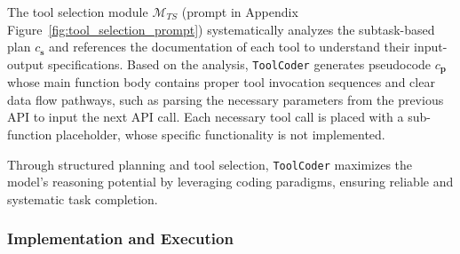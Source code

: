 The tool selection module $\mathcal{M}_{TS}$ (prompt in Appendix Figure~\ref{fig:tool_selection_prompt}) systematically analyzes the subtask-based plan $c_{\boldsymbol{s}}$ and references the documentation of each tool to understand their input-output specifications.  
Based on the analysis, \texttt{ToolCoder} generates pseudocode $c_{\boldsymbol{p}}$ whose main function body contains proper tool invocation sequences and clear data flow pathways, such as parsing the necessary parameters from the previous API to input the next API call. Each necessary tool call is placed with a sub-function placeholder, whose specific functionality is not implemented.

Through structured planning and tool selection, \texttt{ToolCoder} maximizes the model's reasoning potential by leveraging coding paradigms, ensuring reliable and systematic task completion.


\subsubsection{Implementation and Execution}
\label{sec:main_function}
